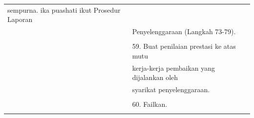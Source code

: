 \documentclass[
]{article}
\begin{document}
\begin{longtable}[]{@{}ll@{}}
\begin{minipage}[t]{0.71\columnwidth}
sempurna. ika puashati ikut Prosedur Laporan\strut
\end{minipage}\tabularnewline
\begin{minipage}[t]{0.23\columnwidth}\raggedright
\strut
\end{minipage} & \begin{minipage}[t]{0.71\columnwidth}\raggedright
Penyelenggaraan (Langkah 73-79).\strut
\end{minipage}\tabularnewline
\begin{minipage}[t]{0.23\columnwidth}\raggedright
\strut
\end{minipage} & \begin{minipage}[t]{0.71\columnwidth}\raggedright
\strut
\end{minipage}\tabularnewline
\begin{minipage}[t]{0.23\columnwidth}\raggedright
\strut
\end{minipage} & \begin{minipage}[t]{0.71\columnwidth}\raggedright
59. Buat penilaian prestasi ke atas mutu\strut
\end{minipage}\tabularnewline
\begin{minipage}[t]{0.23\columnwidth}\raggedright
\strut
\end{minipage} & \begin{minipage}[t]{0.71\columnwidth}\raggedright
kerja-kerja pembaikan yang dijalankan oleh\strut
\end{minipage}\tabularnewline
\begin{minipage}[t]{0.23\columnwidth}\raggedright
\strut
\end{minipage} & \begin{minipage}[t]{0.71\columnwidth}\raggedright
syarikat penyelenggaraan.\strut
\end{minipage}\tabularnewline
\begin{minipage}[t]{0.23\columnwidth}\raggedright
\strut
\end{minipage} & \begin{minipage}[t]{0.71\columnwidth}\raggedright
\strut
\end{minipage}\tabularnewline
\begin{minipage}[t]{0.23\columnwidth}\raggedright
\strut
\end{minipage} & \begin{minipage}[t]{0.71\columnwidth}\raggedright
60. Failkan.\strut
\end{minipage}\tabularnewline
\begin{minipage}[t]{0.23\columnwidth}\raggedright

\end{minipage}
\end{longtable}
\end{document}
